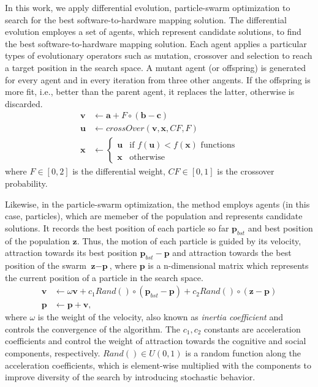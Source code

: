 In this work, we apply differential evolution, particle-swarm optimization to search for the best software-to-hardware mapping solution. The differential evolution employes a set of agents, which represent candidate solutions,  to find the best software-to-hardware mapping solution. Each agent applies a particular types of evolutionary operators such as mutation, crossover and selection to reach a target position in the search space. A mutant agent (or offspring) is generated for every agent and in every iteration from three other angents. If the offspring is more fit, i.e., better than the parent agent, it replaces the latter, otherwise is discarded.
\begin{align}
\label{eqn_de_mutation}
\textbf{v} & \leftarrow   \textbf{a} + F\circ(\textbf{b}-\textbf{c})\\
\label{eqn_de_crossover}
\textbf{u}&\leftarrow crossOver(\textbf{v},\textbf{x},CF,F)\\
\label{eqn_de_selection}
\textbf{x} &\leftarrow 
\begin{cases}
	\textbf{u} & \mbox{if } f(\textbf{u}) < f(\textbf{x})\mbox{ functions}\\
	\textbf{x} & \mbox{otherwise }
\end{cases}
\end{align}
where $F\in[0,2]$ is the differential weight, $CF\in[0,1]$ is the crossover probability.

Likewise, in the particle-swarm optimization, the method employs agents (in this case, particles), which are memeber of the population and represents candidate solutions. It records the best position of each particle so far $\textbf{p}_{bst}$ and best position of the population $\textbf{z}$. Thus, the motion of each particle is guided by its velocity, attraction towards its best position $\textbf{p}_{bst}-\textbf{p}$ and attraction towards the best position of the swarm $\textbf{z}-\textbf{p}$, where $\textbf{p}$ is a n-dimensional matrix which represents the current position of a particle in the search space.
\begin{align}
\label{eqn_pso_velocity}
\textbf{v} &\leftarrow  \omega\textbf{v} + c_1Rand()\circ(\textbf{p}_{bst}-\textbf{p}) + c_2Rand()\circ(\textbf{z}-\textbf{p})\\
\label{eqn_pso_position}
\textbf{p} &\leftarrow \textbf{p} + \textbf{v},
\end{align}
where $\omega$ is the weight of the velocity, also known as \textit{inertia coefficient} and controls the convergence of the algorithm. The $c_1, c_2$ constants are acceleration coefficients and control the weight of attraction towards the cognitive and social components, respectively. $Rand()\in U(0,1)$ is a random function along the acceleration coefficients, which is element-wise multiplied with the components to improve diversity of the search by introducing stochastic behavior.